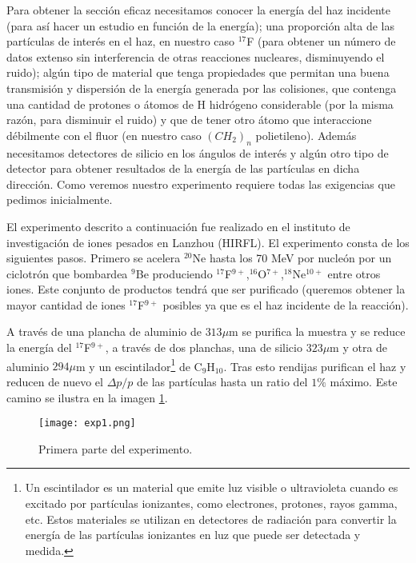 \documentclass[fleqn,11pt]{SelfArx} %
\begin{document}
Para obtener la sección eficaz necesitamos conocer la energía del haz incidente (para así hacer un estudio en función de la energía); una proporción alta de las partículas de interés en el haz, en nuestro caso $^{17}$F (para obtener un número de datos extenso sin interferencia de otras reacciones nucleares, disminuyendo el ruido); algún tipo de material que tenga propiedades que permitan una buena transmisión y dispersión de la energía generada por las colisiones, que contenga una cantidad de protones o átomos de H hidrógeno considerable (por la misma razón, para disminuir el ruido) y que de tener otro átomo que interaccione débilmente con el fluor (en nuestro caso $(CH_2)_n$ polietileno). Además necesitamos detectores de silicio en los ángulos de interés y algún otro tipo de detector para obtener resultados de la energía de las partículas en dicha dirección. Como veremos nuestro experimento requiere todas las exigencias que pedimos inicialmente.

El experimento descrito a continuación fue realizado en el instituto de investigación de iones pesados en Lanzhou (HIRFL). El experimento consta de los siguientes pasos. Primero se acelera $^{20}$Ne hasta los 70 MeV por nucleón por un ciclotrón que bombardea $^{9}$Be produciendo $^{17}$F$^{9+ }$,$^{16}$O$^{7+ }$,$^{18}$Ne$^{10+}$ entre otros iones. Este conjunto de productos tendrá que ser purificado (queremos obtener la mayor cantidad de iones $^{17}$F$^{9+ }$ posibles ya que es el haz incidente de la reacción). 

A través de una plancha de aluminio de $313\mu$m se purifica la muestra y se reduce la energía del $^{17}$F$^{9+ }$, a través de dos planchas, una de silicio $323\mu$m y otra de aluminio $294\mu$m y un escintilador\footnote{Un escintilador es un material que emite luz visible o ultravioleta cuando es excitado por partículas ionizantes, como electrones, protones, rayos gamma, etc. Estos materiales se utilizan en detectores de radiación para convertir la energía de las partículas ionizantes en luz que puede ser detectada y medida.} de C$_9$H$_{10}$. Tras esto rendijas purifican el haz y reducen de nuevo el $\Delta p/p$ de las partículas hasta un ratio del $1\%$ máximo. Este camino se ilustra en la imagen \ref{Fig:07}. 

\begin{figure}[h!] \centering
	\texttt{[image: exp1.png]}
	\caption{Primera parte del experimento.}
	\label{Fig:07}
\end{figure}
\end{document}
